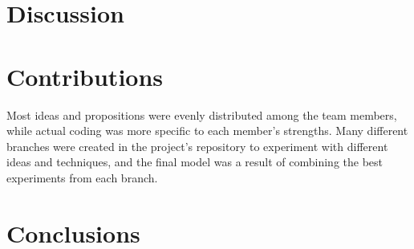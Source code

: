 \documentclass[11pt]{article}
\begin{document}
\begin{multicols}{2}
      \section{Discussion}

      \section{Contributions}

      Most ideas and propositions were evenly distributed among the team members, while actual coding was more specific to each member's strengths. Many different branches were created in the project's repository to experiment with different ideas and techniques, and the final model was a result of combining the best experiments from each branch.

      \section{Conclusions}

      
      

\end{multicols}
\end{document}
